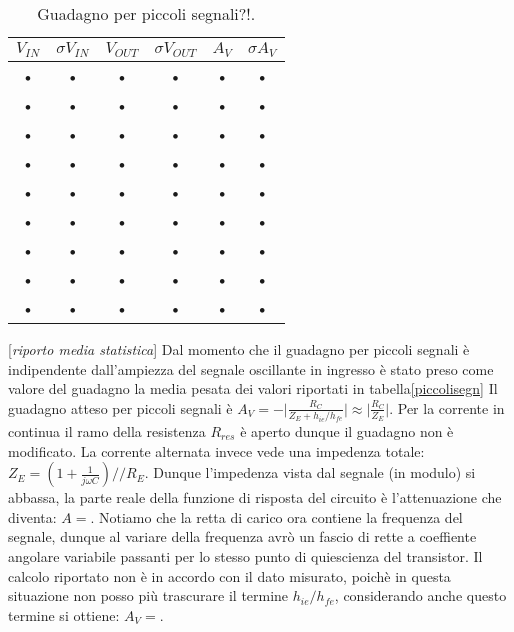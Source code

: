 \documentclass[10pt,a4paper]{article}
\newcommand{\rem}[1]{[\emph{#1}]}
\begin{document}
\begin{table}[h]
\centering
\begin{tabular}{|c|c|c|c|c|c|}
\hline 
$V_{IN}$ & $\sigma V_{IN}$ & $V_{OUT}$ & $\sigma V_{OUT}$ & $A_V$ & $\sigma A_V$ \\ 
\hline 
• & • & • & • & • & • \\ 
\hline 
• & • & • & • & • & • \\ 
\hline 
• & • & • & • & • & • \\ 
\hline 
• & • & • & • & • & • \\ 
\hline 
• & • & • & • & • & • \\ 
\hline 
• & • & • & • & • & • \\ 
\hline 
• & • & • & • & • & • \\ 
\hline 
• & • & • & • & • & • \\ 
\hline 
• & • & • & • & • & • \\ 
\hline 
\end{tabular}

\caption{Guadagno per piccoli segnali?!.}
\end{table}

\rem{riporto media statistica}
Dal momento che il guadagno per piccoli segnali è indipendente dall'ampiezza del segnale oscillante in ingresso è stato preso come valore del guadagno la media pesata dei valori riportati in tabella\ref{piccolisegn}
Il guadagno atteso per piccoli segnali è $A_V=-\vert \frac{R_C}{Z_E+h_{ie}/h_{fe}} \vert \approx \vert \frac{R_C}{Z_E} \vert$. 
Per la corrente in continua il ramo della resistenza $R_{res}$ è aperto dunque il guadagno non è modificato. La corrente alternata invece vede una impedenza totale: $Z_{E} = (1+\frac{1}{j \omega C})//R_{E}$. Dunque l'impedenza vista dal segnale (in modulo) si abbassa, la parte reale della funzione di risposta del circuito è l'attenuazione che diventa: $A = $. Notiamo che la retta di carico ora contiene la frequenza del segnale, dunque al variare della frequenza avrò un fascio di rette a coeffiente angolare variabile passanti per lo stesso punto di quiescienza del transistor.
Il calcolo riportato non è in accordo con il dato misurato, poichè in questa situazione non posso più trascurare il termine $h_{ie}/h_{fe}$, considerando anche questo termine si ottiene: $A_V = $.
\end{document}

